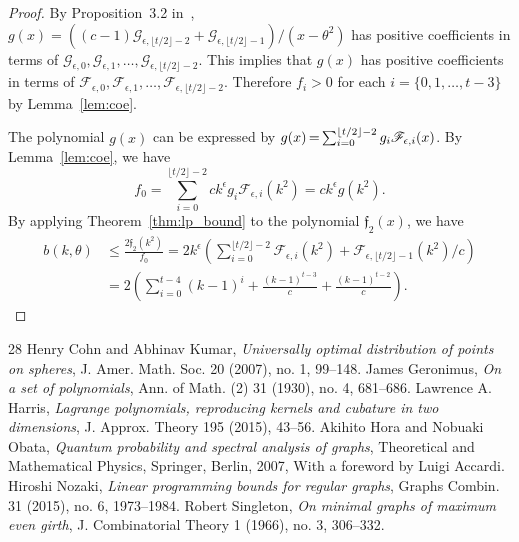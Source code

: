 \documentclass[10pt]{amsart}
\newcommand*{\Mk}{\mkern -2mu}
\begin{document}
\begin{proof}
By Proposition~3.2 in~\cite{CK07}, 
$g(x)=((c-1)\mathscr{G}_{\epsilon,\lfloor t/2 \rfloor-2}+\mathscr{G}_{\epsilon,\lfloor t/2 \rfloor-1})/(x-\theta^2)$ has positive coefficients 
in terms of $\mathscr{G}_{\epsilon,0},\mathscr{G}_{\epsilon,1},\ldots, \mathscr{G}_{\epsilon,\lfloor t/2 \rfloor-2}$. This implies that $g(x)$ has positive 
coefficients in terms of $\mathscr{F}_{\epsilon,0},\mathscr{F}_{\epsilon,1},\ldots, \mathscr{F}_{\epsilon,\lfloor t/2 \rfloor-2}$.
Therefore $f_i>0$ for each $i=\{0,1,\ldots, t-3 \}$ by 
Lemma~\ref{lem:coe}. 

The polynomial $g(x)$ can be expressed by $g(x)\Mk =\Mk \sum_{i=0}^{\lfloor t/2 \rfloor-2}g_i \mathscr{F}_{\epsilon,i}(x)$. 
By Lemma~\ref{lem:coe}, we have
\[
f_0=\sum_{i=0}^{\lfloor t/2 \rfloor-2} c k^{\epsilon} g_i \mathscr{F}_{\epsilon,i}(k^2)=c k^{\epsilon} g(k^2).
\]
By applying Theorem~\ref{thm:lp_bound} to the polynomial $\mathfrak{f}_2(x)$, we have
\begin{align*}
b(k,\theta) &\leq \frac{2\mathfrak{f}_2(k^2)}{f_0}=2k^\epsilon\left( \sum_{i=0}^{\lfloor t/2 \rfloor-2}\mathscr{F}_{\epsilon,i}(k^2)+\mathscr{F}_{\epsilon,\lfloor t/2 \rfloor-1}(k^2)/c \right) \\
&=2\left( \sum_{i=0}^{t-4} (k-1)^{i}+ \frac{(k-1)^{t-3}}{c}+
\frac{(k-1)^{t-2}}{c}
\right).
\end{align*}
\end{proof}
\begin{thebibliography}{28}
 Henry Cohn and Abhinav Kumar, \emph{Universally optimal distribution of points on spheres}, J. Amer. Math. Soc. 20 (2007), no. 1, 99--148.
 James Geronimus, \emph{On a set of polynomials}, Ann. of Math. (2) 31 (1930), no. 4, 681--686.
 Lawrence A. Harris, \emph{Lagrange polynomials, reproducing kernels and cubature in two dimensions}, J. Approx. Theory 195 (2015), 43--56.
 Akihito Hora and Nobuaki Obata, \emph{Quantum probability and spectral analysis of graphs}, Theoretical and Mathematical Physics, Springer, Berlin, 2007, With a foreword by Luigi Accardi.
 Hiroshi Nozaki, \emph{Linear programming bounds for regular graphs}, Graphs Combin. 31 (2015), no. 6, 1973--1984.
 Robert Singleton, \emph{On minimal graphs of maximum even girth}, J. Combinatorial Theory 1 (1966), no. 3, 306--332.
\end{thebibliography}
\end{document}
